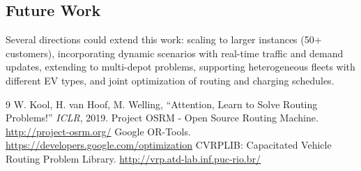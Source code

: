 \documentclass[10pt,a4paper]{article}
\begin{document}
\subsection{Future Work}
Several directions could extend this work: scaling to larger instances (50+ customers), incorporating dynamic scenarios with real-time traffic and demand updates, extending to multi-depot problems, supporting heterogeneous fleets with different EV types, and joint optimization of routing and charging schedules.

\begin{thebibliography}{9}
 W. Kool, H. van Hoof, M. Welling, ``Attention, Learn to Solve Routing Problems!'' \emph{ICLR}, 2019.
 Project OSRM - Open Source Routing Machine. \url{http://project-osrm.org/}
 Google OR-Tools. \url{https://developers.google.com/optimization}
 CVRPLIB: Capacitated Vehicle Routing Problem Library. \url{http://vrp.atd-lab.inf.puc-rio.br/}
\end{thebibliography}
\end{document}
